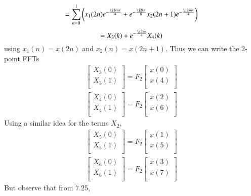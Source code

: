\documentclass[journal,12pt,twocolumn]{IEEEtran}
\renewcommand\thesection{\arabic{section}}
\begin{document}
\begin{enumerate}[label=\thesection.\arabic*
	,ref=\thesection.\theenumi]
\begin{enumerate}[label=\arabic*.,ref=\thesection.\theenumi]
\begin{equation}
	= \sum_{n = 0}^{1}\brak{x_1(2n)e^{-\frac{\j2kn\pi}{4}} + e^{-\frac{\j2k\pi}{8}}x_2(2n + 1)e^{-\frac{\j2kn\pi}{4}}}
\end{equation}
\begin{equation}	
	= X_3(k) + e^{-\frac{\j2k\pi}{4}}X_4(k) 
\end{equation}
using $x_1(n) = x(2n)$ and $x_2(n) = x(2n + 1)$. Thus we can write the 2-point FFTs
\begin{align}
	\begin{bmatrix}
		X_{3}(0) \\ 
		X_{3}(1)\\ 
	\end{bmatrix}
	= F_{2}
	\begin{bmatrix}
		x(0) \\ 
		x(4) \\ 
	\end{bmatrix} \\
	\begin{bmatrix}
		X_{4}(0) \\ 
		X_{4}(1)\\ 
	\end{bmatrix}
	= F_{2}
	\begin{bmatrix}
		x(2) \\ 
		x(6) \\ 
	\end{bmatrix}
\end{align}
Using a similar idea for the terms $X_2$, 
\begin{align}
	\begin{bmatrix}
		X_{5}(0) \\ 
		X_{5}(1)\\ 
	\end{bmatrix}
	= F_{2}
	\begin{bmatrix}
		x(1) \\ 
		x(5) \\ 
	\end{bmatrix} \\
	\begin{bmatrix}
		X_{6}(0) \\ 
		X_{6}(1)\\ 
	\end{bmatrix}
	= F_{2}
	\begin{bmatrix}
		x(3) \\ 
		x(7) \\ 
	\end{bmatrix}
\end{align}
But observe that from 7.25,

\end{enumerate}
\end{enumerate}
\end{document}
